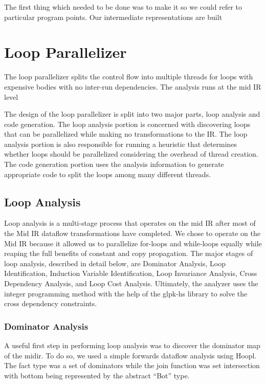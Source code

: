 \documentclass[11pt]{article}
\begin{document}
The first thing which needed to be done was to make it so we could
refer to particular program points.  Our intermediate representations
are built 

\section{Loop Parallelizer}

The loop parallelizer splits the control flow into multiple threads
for loops with expensive bodies with no inter-run dependencies. The
analysis runs at the mid IR level 

The design of the loop parallelizer is split into two major parts,
loop analysis and code generation. The loop analysis portion is
concerned with discovering loops that can be parallelized while making
no transformations to the IR. The loop analysis portion is also
responsible for running a heuristic that determines whether loops
should be parallelized considering the overhead of thread
creation. The code generation portion uses the analysis information to 
generate appropriate code to split the loops among many different
threads.

\subsection { Loop Analysis } 

Loop analysis is a multi-stage process that operates on the mid IR
after most of the Mid IR dataflow transformations have completed. We
chose to operate on the Mid IR because it allowed us to parallelize
for-loops and while-loops equally while reaping the full benefits of
constant and copy propagation. The major stages of loop analysis,
described in detail below, are Dominator Analysis, Loop
Identification, Induction Variable Identification, Loop Invariance
Analysis, Cross Dependency Analysis, and Loop Cost
Analysis. Ultimately, the analyzer uses the integer programming method
with the help of the glpk-hs library to solve the cross dependency
constraints.

\subsubsection {Dominator Analysis} 

A useful first step in performing loop analysis was to discover the
dominator map of the midir. To do so, we used a simple forwards
dataflow analysis using Hoopl. The fact type was a set of dominators
while the join function was set intersection with bottom being
represented by the abstract ``Bot'' type. 
\end{document}
